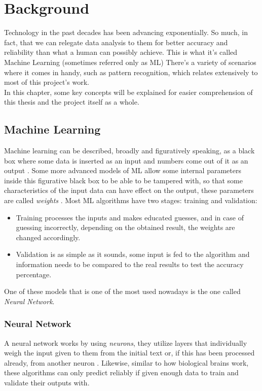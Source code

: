 \chapter{Background}
Technology in the past decades has been advancing exponentially. So much, in fact, that we can relegate data analysis to them for better accuracy and reliability than what a human can possibly achieve. This is what it's called Machine Learning (sometimes referred only as ML)
There's a variety of scenarios where it comes in handy, such as pattern recognition, which relates extensively to most of this project's work.\\
In this chapter, some key concepts will be explained for easier comprehension of this thesis and the project itself as a whole.

\section{Machine Learning}
Machine learning can be described, broadly and figuratively speaking, as a black box where some data is inserted as an input and numbers come out of it as an output \citep{rf8}.
Some more advanced models of ML allow some internal parameters inside this figurative black box to be able to be tampered with, so that some characteristics of the input data can have effect on the output, these parameters are called \textit{weights} \citep{rf9}.
Most ML algorithms have two stages: training and validation:
\begin{itemize}
\item Training processes the inputs and makes educated guesses, and in case of guessing incorrectly, depending on the obtained result, the weights are changed accordingly.
\item Validation is as simple as it sounds, some input is fed to the algorithm and information needs to be compared to the real results to test the accuracy percentage.
\end{itemize}
One of these models that is one of the most used nowadays is the one called \textit{Neural Network}.

\subsection{Neural Network}
A neural network works by using \textit{neurons}, they utilize layers that individually weigh the input given to them from the initial text or, if this has been processed already, from another neuron \citep{rf9}.
Likewise, similar to how biological brains work, these algorithms can only predict reliably if given enough data to train and validate their outputs with.

